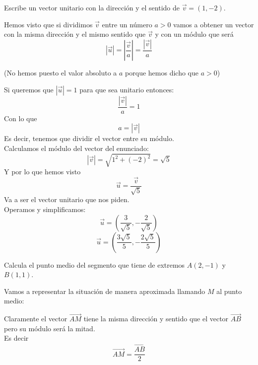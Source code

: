 \documentclass[a4paper,11pt,answers]{exam}
\begin{document}
\begin{questions}

\question Escribe un vector unitario con la dirección y el sentido de $\vec{v} = (1,-2)$.
  \begin{solution}
    Hemos visto que si dividimos $\vec{v}$ entre un número $a>0$ vamos a obtener un vector
    con la misma dirección y el mismo sentido que $\vec{v}$ y con un módulo que será
    \[|\vec{u}| = \left|\frac{\vec{v}}{a}\right| = \frac{|\vec{v}|}{a}\]
    \begin{center}
      \small{(No hemos puesto el valor absoluto a $a$ porque hemos dicho que $a>0$)}
    \end{center}
    Si queremos que $|\vec{u}| = 1$ para que sea unitario entonces:
    \[\frac{|\vec{v}|}{a} = 1\]
    Con lo que
    \[a = |\vec{v}|\]
    Es decir, tenemos que dividir el vector entre su módulo.\\

    Calculamos el módulo del vector del enunciado:
    \[|\vec{v}| = \sqrt{1^2 + (-2)^2} =\sqrt{5}\]
    Y por lo que hemos visto
    \[\vec{u} = \frac{\vec{v}}{\sqrt{5}}\]
    Va a ser el vector unitario que nos piden.\\

    Operamos y simplificamos:
    \[\vec{u} = \left(\frac{3}{\sqrt{5}},-\frac{2}{\sqrt{5}}\right)\]
    \[\vec{u} = \left(\frac{3\sqrt{5}}{5},-\frac{2\sqrt{5}}{5}\right)\]
  \end{solution}
\question Calcula el punto medio del segmento que tiene de extremos $A(2, -1)$ y $B(1, 1)$.
  \begin{solution}
    Vamos a representar la situación de manera aproximada llamando $M$ al punto medio:
    \begin{center}
    \end{center}
    Claramente el vector $\overrightarrow{AM}$ tiene la misma dirección y sentido que el vector
    $\overrightarrow{AB}$ pero su módulo será la mitad.\\
    Es decir
    \[\overrightarrow{AM} = \frac{\overrightarrow{AB}}{2}\]


\end{solution}
\end{questions}
\end{document}
